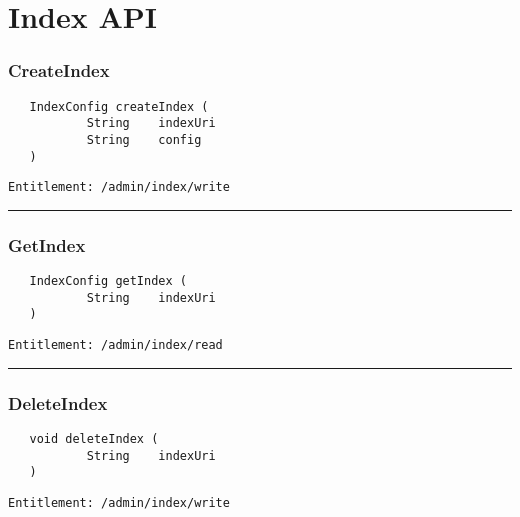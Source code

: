 \chapter{Index API}

\subsection{CreateIndex}
\label{Api:CreateIndex}
\begin{Verbatim}
   IndexConfig createIndex (
           String    indexUri
           String    config
   )
\end{Verbatim}
\begin{Verbatim}[formatcom=\color{Maroon}]
  Entitlement: /admin/index/write
\end{Verbatim}



\rule{12cm}{2pt}
\subsection{GetIndex}
\label{Api:GetIndex}
\begin{Verbatim}
   IndexConfig getIndex (
           String    indexUri
   )
\end{Verbatim}
\begin{Verbatim}[formatcom=\color{Maroon}]
  Entitlement: /admin/index/read
\end{Verbatim}



\rule{12cm}{2pt}
\subsection{DeleteIndex}
\label{Api:DeleteIndex}
\begin{Verbatim}
   void deleteIndex (
           String    indexUri
   )
\end{Verbatim}
\begin{Verbatim}[formatcom=\color{Maroon}]
  Entitlement: /admin/index/write
\end{Verbatim}



